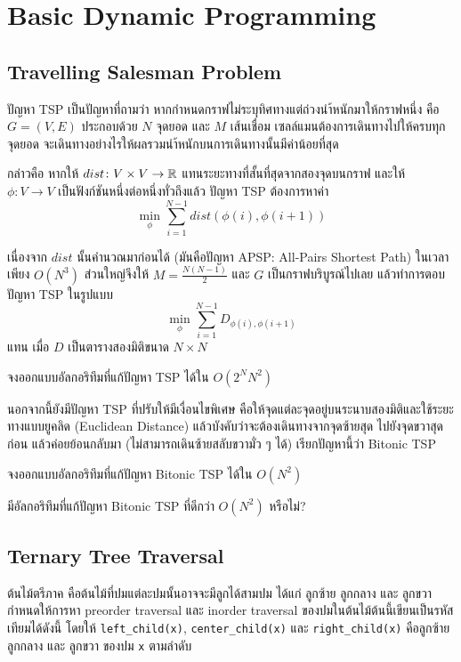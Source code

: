 \chapter{Basic Dynamic Programming}

\section{Travelling Salesman Problem}

ปัญหา TSP เป็นปัญหาที่ถามว่า หากกำหนดกราฟไม่ระบุทิศทางแต่ถ่วงนำ้หนักมาให้กราฟหนึ่ง คือ $G = (V, E)$ ประกอบด้วย $N$ จุดยอด และ $M$ เส้นเชื่อม เซลล์แมนต้องการเดินทางไปให้ครบทุกจุดยอด จะเดินทางอย่างไรให้ผลรวมนำ้หนักบนการเดินทางนั้นมีค่าน้อยที่สุด

กล่าวคือ หากให้ $dist \colon V \times V \to \mathbb{R}$ แทนระยะทางที่สั้นที่สุดจากสองจุดบนกราฟ และให้ $\phi \colon V \to V$ เป็นฟังก์ชันหนึ่งต่อหนึ่งทั่วถึงแล้ว ปัญหา TSP ต้องการหาค่า
\[
\min_{\phi} \sum_{i=1}^{N-1} dist(\phi(i), \phi(i+1))
\]

เนื่องจาก $dist$ นั้นคำนวณมาก่อนได้ (มันคือปัญหา APSP: All-Pairs Shortest Path) ในเวลาเพียง $O(N^3)$ ส่วนใหญ่จึงให้ $M = \frac{N(N-1)}{2}$ และ $G$ เป็นกราฟบริบูรณ์ไปเลย แล้วทำการตอบปัญหา TSP ในรูปแบบ
\[
\min_{\phi} \sum_{i=1}^{N-1} D_{\phi(i), \phi(i+1)}
\]
แทน เมื่อ $D$ เป็นตารางสองมิติขนาด $N \times N$

\begin{exercise}
จงออกแบบอัลกอริทึมที่แก้ปัญหา TSP ได้ใน $O(2^N N^2)$
\end{exercise}

นอกจากนี้ยังมีปัญหา TSP ที่ปรับให้มีเงื่อนไขพิเศษ คือให้จุดแต่ละจุดอยู่บนระนาบสองมิติและใช้ระยะทางแบบยูคลิด (Euclidean Distance) แล้วบังคับว่าจะต้องเดินทางจากจุดซ้ายสุด ไปยังจุดขวาสุดก่อน แล้วค่อยย้อนกลับมา (ไม่สามารถเดินซ้ายสลับขวามั่ว ๆ ได้) เรียกปัญหานี้ว่า Bitonic TSP

\begin{exercise}
จงออกแบบอัลกอริทึมที่แก้ปัญหา Bitonic TSP ได้ใน $O(N^2)$
\end{exercise}

\begin{bonus}
มีอัลกอริทึมที่แก้ปัญหา Bitonic TSP ที่ดีกว่า $O(N^2)$ หรือไม่?
\end{bonus}

\section{Ternary Tree Traversal}
\label{ipst:o59_oct_c1_ternary}

ต้นไม้ตรีภาค คือต้นไม้ที่ปมแต่ละปมนั้นอาจจะมีลูกได้สามปม ได้แก่ ลูกซ้าย ลูกกลาง และ ลูกขวา กำหนดให้การหา preorder traversal และ inorder traversal ของปมในต้นไม้ต้นนี้เขียนเป็นรหัสเทียมได้ดังนี้ โดยให้ \texttt{left\_child(x)}, \texttt{center\_child(x)} และ \texttt{right\_child(x)} คือลูกซ้าย ลูกกลาง และ ลูกขวา ของปม \texttt{x} ตามลำดับ

